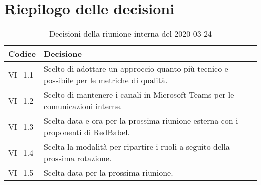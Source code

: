 \section{Riepilogo delle decisioni}
\begin{longtable}{ 
	 >{\centering}p{} >{}p{} }
	
	\caption{Decisioni della riunione interna del 2020-03-24}\\	
	
	\textbf{\color{white}Codice} & 
	\textbf{\color{white}Decisione} 
	\tabularnewline  
	\endhead
	
	VI\_1.1 & Scelto di adottare un approccio quanto più tecnico e possibile per le metriche di qualità. \\
	VI\_1.2 & Scelto di mantenere i canali in Microsoft Teams per le comunicazioni interne. \\
	VI\_1.3 & Scelta data e ora per la prossima riunione esterna con i proponenti di RedBabel. \\
	VI\_1.4 & Scelta la modalità per ripartire i ruoli a seguito della prossima rotazione. \\
	VI\_1.5 & Scelta data per la prossima riunione. \\
	
\end{longtable}